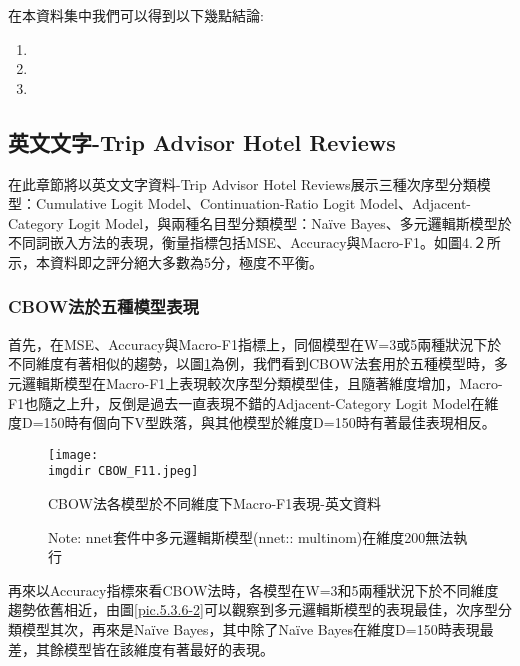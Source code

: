 	在本資料集中我們可以得到以下幾點結論:
	
\begin{enumerate}[1.]
\setlength{\itemsep}{-10pt}
\item {}
\item {}
\item {}
\end{enumerate}


\subsection{英文文字-Trip Advisor Hotel Reviews}
	
	在此章節將以英文文字資料-Trip Advisor Hotel Reviews展示三種次序型分類模型：Cumulative Logit Model、Continuation-Ratio Logit Model、Adjacent-Category Logit Model，與兩種名目型分類模型：Naïve Bayes、多元邏輯斯模型於不同詞嵌入方法的表現，衡量指標包括MSE、Accuracy與Macro-F1。如圖4.２所示，本資料即之評分絕大多數為5分，極度不平衡。
	
\subsubsection{CBOW法於五種模型表現}

	首先，在MSE、Accuracy與Macro-F1指標上，同個模型在W=3或5兩種狀況下於不同維度有著相似的趨勢，以圖\ref{pic.5.3.6-1}為例，我們看到CBOW法套用於五種模型時，多元邏輯斯模型在Macro-F1上表現較次序型分類模型佳，且隨著維度增加，Macro-F1也隨之上升，反倒是過去一直表現不錯的Adjacent-Category Logit Model在維度D=150時有個向下V型跌落，與其他模型於維度D=150時有著最佳表現相反。
		
\begin{figure}[H]
    \centering
        \texttt{[image: \\imgdir CBOW\_F11.jpeg]}
    \caption{CBOW法各模型於不同維度下Macro-F1表現-英文資料}
    \label{pic.5.3.6-1}
    \caption*{\footnotesize{Note: nnet套件中多元邏輯斯模型(nnet:: multinom)在維度200無法執行}}
\end{figure}
	
	再來以Accuracy指標來看CBOW法時，各模型在W=3和5兩種狀況下於不同維度趨勢依舊相近，由圖\ref{pic.5.3.6-2}可以觀察到多元邏輯斯模型的表現最佳，次序型分類模型其次，再來是Naïve Bayes，其中除了Naïve Bayes在維度D=150時表現最差，其餘模型皆在該維度有著最好的表現。
	
